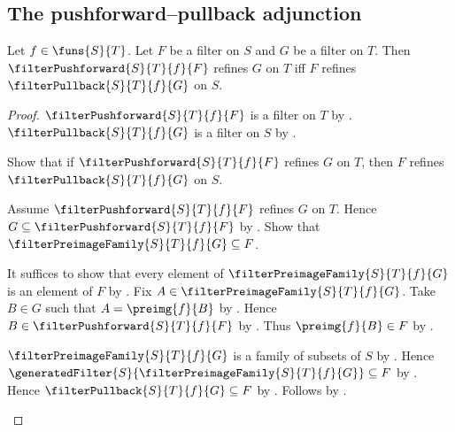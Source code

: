 \subsection{The pushforward--pullback adjunction}

\begin{theorem}\label{filter_pushforward_pullback_adjunction}
    Let $f\in\funs{S}{T}$.
    Let $F$ be a filter on $S$ and $G$ be a filter on $T$.
    Then $\filterPushforward{S}{T}{f}{F}$ refines $G$ on $T$ iff
        $F$ refines $\filterPullback{S}{T}{f}{G}$ on $S$.
\end{theorem}
\begin{proof}
    $\filterPushforward{S}{T}{f}{F}$ is a filter on $T$ by
        .
    $\filterPullback{S}{T}{f}{G}$ is a filter on $S$ by
        .

    Show that if $\filterPushforward{S}{T}{f}{F}$ refines $G$ on $T$,
        then $F$ refines $\filterPullback{S}{T}{f}{G}$ on $S$.
    \begin{subproof}
        Assume $\filterPushforward{S}{T}{f}{F}$ refines $G$ on $T$.
        Hence $G\subseteq\filterPushforward{S}{T}{f}{F}$ by
            .
        Show that $\filterPreimageFamily{S}{T}{f}{G}\subseteq F$.
        \begin{subproof}
            It suffices to show that every element of
                $\filterPreimageFamily{S}{T}{f}{G}$ is an element of $F$
                by .
            Fix $A\in\filterPreimageFamily{S}{T}{f}{G}$.
            Take $B\in G$ such that $A=\preimg{f}{B}$ by
                .
            Hence $B\in\filterPushforward{S}{T}{f}{F}$ by
                .
            Thus $\preimg{f}{B}\in F$ by .
        \end{subproof}
        $\filterPreimageFamily{S}{T}{f}{G}$ is a family of subsets of $S$
            by .
        Hence $\generatedFilter{S}{\filterPreimageFamily{S}{T}{f}{G}}
            \subseteq F$ by .
        Hence $\filterPullback{S}{T}{f}{G}\subseteq F$ by
            .
        Follows by .
    \end{subproof}


\end{proof}
